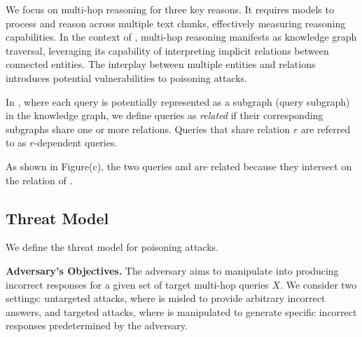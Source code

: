 We focus on multi-hop reasoning for three key reasons.  It requires models to process and reason across multiple text chunks, effectively measuring reasoning capabilities.  In the context of \rag, multi-hop reasoning manifests as knowledge graph traversal, leveraging its capability of interpreting implicit relations between connected entities.  The interplay between multiple entities and relations introduces potential vulnerabilities to poisoning attacks.

In \rag, where each query is potentially represented as a subgraph (query subgraph) in the knowledge graph, we define queries as {\em related} if their corresponding subgraphs share one or more relations. Queries that share relation $r$ are referred to as $r$-dependent queries.

\begin{mtbox}{}
\begin{example}
\label{exp:intersection}
As shown in Figure(c), the two queries  and  are related because they intersect on the relation of .
\end{example}
\end{mtbox}





\subsection{Threat Model}
We define the threat model for \rag poisoning attacks.

\vspace{1pt}
{\bf Adversary's Objectives.}
The adversary aims to manipulate \rag into producing incorrect responses for a given set of target multi-hop queries $X$. We consider two settings: untargeted attacks, where \rag is misled to provide arbitrary incorrect answers, and targeted attacks, where \rag is manipulated to generate specific incorrect responses predetermined by the adversary. 

